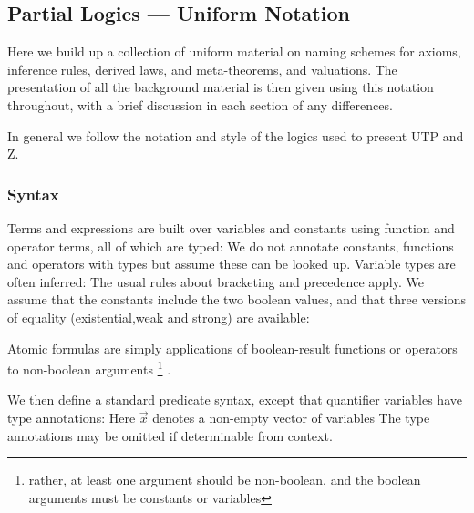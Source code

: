 \subsection{Partial Logics --- Uniform Notation}

Here we build up a collection of uniform material
on naming schemes for
axioms, inference rules, derived laws, and meta-theorems,
and valuations.
The presentation of all the background material is then given
using this notation throughout,
with a brief discussion in each section of any differences.

In general we follow the notation and style of the logics
used to present UTP and Z.

\subsubsection{Syntax}

Terms and expressions are built over variables and constants
using function and operator terms, all of which are typed:
We do not annotate constants, functions and operators
with types but assume these can be looked up.
Variable types are often inferred:
The usual rules about bracketing and precedence apply.
We assume that the constants include the two boolean values,
and that three versions of equality
(existential,weak and strong) are available:

Atomic formulas are simply applications of boolean-result
functions or operators to non-boolean arguments%
\footnote{rather, at least one argument should be non-boolean,
and the boolean arguments must be constants or variables}%
.

We then define a standard predicate syntax,
except that quantifier variables have type
annotations:
Here $\vec x$ denotes a non-empty vector of variables
The type annotations may be omitted if determinable
from context.

